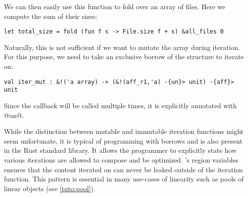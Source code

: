 We can then easily use this function to fold over an array of files. Here
we compute the sum of their sizes:
\begin{lstlisting}
let total_size = fold (fun f s -> File.size f + s) &all_files 0
\end{lstlisting}

Naturally, this is not sufficient if we want to mutate the array during iteration.
For this purpose, we need to take an exclusive borrow of the structure to iterate
on:
\begin{lstlisting}
val iter_mut : &!('a array) -> (&!(aff_r1,'a) -{un}> unit) -{aff}> unit
\end{lstlisting}

Since the callback will be called multiple times, it is explicitly
annotated with @un@.

While the distinction between mutable and immutable iteration functions
might seem unfortunate, it is typical of
programming with borrows and is also present in the Rust standard library.
It allows the programmer to explicitly state how various iterations
are allowed to compose and be optimized.
\lang's region variables ensures that the content iterated on can never
be leaked outside of the iteration function.
This pattern is essential in many use-cases of linearity such
as pools of linear objects (see \cref{tuto:pool}).

\lstDeleteShortInline@

